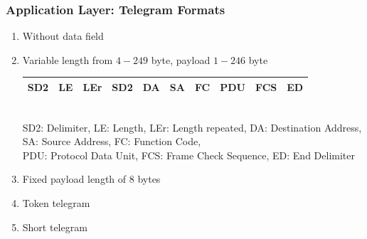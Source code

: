 \documentclass{beamer}
\begin{document}
\begin{frame}
  \frametitle{Application Layer: Telegram Formats}
  \begin{enumerate}
    \item Without data field \\
    \item Variable length from $4-249$ byte, payload $1-246$ byte \\
      \footnotesize
      \begin{tabular}[h]{|c|c|c|c|c|c|c|c|c|c|}
        \hline
        SD2 & LE & LEr & SD2 & DA & SA & FC & PDU & FCS & ED \\
        \hline
      \end{tabular} \\
      \vspace{3pt}
      \tiny
      SD2: Delimiter, LE: Length, LEr: Length repeated, DA: Destination Address,
      SA: Source Address, FC: Function Code, \\
      \vspace{-5pt}
      PDU: Protocol Data Unit, FCS: Frame Check Sequence, ED: End Delimiter
      \normalsize
    \item Fixed payload length of $8$ bytes
    \item Token telegram
    \item Short telegram

\end{enumerate}
\end{frame}
\end{document}

